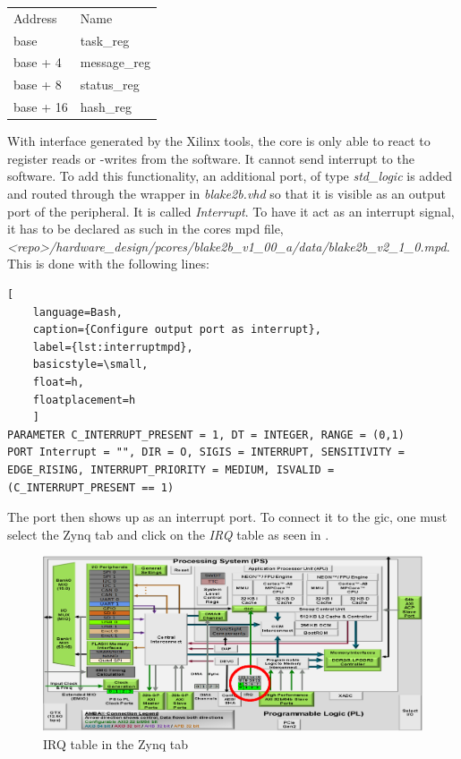 \begin{tabular}{ll}
	Address & Name \\
	base     & task\_reg\\
	base + 4 & message\_reg\\
	base + 8 & status\_reg\\
	base + 16 & hash\_reg\\
\end{tabular}

With interface generated by the Xilinx tools, the core is only able to react to
register reads or -writes from the software.
It cannot send interrupt to the software.
To add this functionality, an additional port, of type \emph{std\_logic} is
added and routed through the wrapper in \emph{blake2b.vhd} so that it is
visible as an output port of the peripheral.
It is called \emph{Interrupt}.
To have it act as an interrupt signal, it has to be declared as such in the
cores \gls{mpd} file,
\emph{<repo>/hardware_design/pcores/blake2b_v1_00_a/data/blake2b\_v2\_1\_0.mpd}.
This is done with the following lines:

\begin{lstlisting}[
	language=Bash,
	caption={Configure output port as interrupt},
	label={lst:interruptmpd},
	basicstyle=\small,
	float=h,
	floatplacement=h
	]
PARAMETER C_INTERRUPT_PRESENT = 1, DT = INTEGER, RANGE = (0,1)
PORT Interrupt = "", DIR = O, SIGIS = INTERRUPT, SENSITIVITY = EDGE_RISING, INTERRUPT_PRIORITY = MEDIUM, ISVALID = (C_INTERRUPT_PRESENT == 1)
\end{lstlisting}

The port then shows up as an interrupt port.
To connect it to the \gls{gic}, one must select the Zynq tab and click on the
\emph{IRQ} table as seen in .

\begin{figure}[h]
\centering
\includegraphics[width=1\textwidth]{sections/methodology/gic}
\caption{\label{fig:gic} IRQ table in the Zynq tab}
\end{figure}

